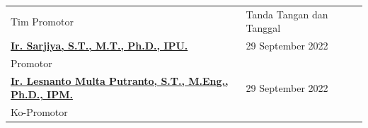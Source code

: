 {
\begin{longtable}{lll}
	\vspace*{2cm}
	\hspace*{21pt}Tim Promotor &\hspace*{-12pt}Tanda Tangan dan Tanggal\\
	\hspace*{-11pt}\underline{\textbf{Ir. Sarjiya, S.T., M.T., Ph.D., IPU.}} 					& \hspace*{0.7cm} 29 September 2022\\ \vspace*{1.5cm} \hspace*{-14pt}Promotor    &\\
	\hspace*{-11pt}\underline{\textbf{Ir. Lesnanto Multa Putranto, S.T., M.Eng., Ph.D., IPM.}}	& \hspace*{0.7cm} 29 September 2022\\ \vspace*{1.5cm} \hspace*{-14pt}Ko-Promotor &\\
\end{longtable}
}
